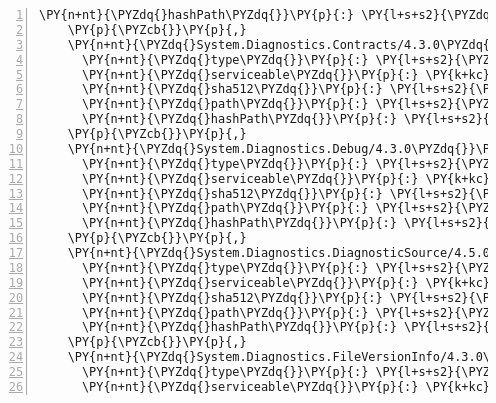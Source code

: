 \begin{Verbatim}[commandchars=\\\{\},numbers=left,firstnumber=1,stepnumber=1,numberblanklines=0]
      \PY{n+nt}{\PYZdq{}hashPath\PYZdq{}}\PY{p}{:} \PY{l+s+s2}{\PYZdq{}system.data.sqlclient.4.5.0\PYZhy{}rc1.nupkg.sha512\PYZdq{}}
    \PY{p}{\PYZcb{}}\PY{p}{,}
    \PY{n+nt}{\PYZdq{}System.Diagnostics.Contracts/4.3.0\PYZdq{}}\PY{p}{:} \PY{p}{\PYZob{}}
      \PY{n+nt}{\PYZdq{}type\PYZdq{}}\PY{p}{:} \PY{l+s+s2}{\PYZdq{}package\PYZdq{}}\PY{p}{,}
      \PY{n+nt}{\PYZdq{}serviceable\PYZdq{}}\PY{p}{:} \PY{k+kc}{true}\PY{p}{,}
      \PY{n+nt}{\PYZdq{}sha512\PYZdq{}}\PY{p}{:} \PY{l+s+s2}{\PYZdq{}sha512\PYZhy{}eelRRbnm+OloiQvp9CXS0ixjNQldjjkHO4iIkR5XH2VIP8sUB/SIpa1TdUW6/+HDcQ+MlhP3pNa1u5SbzYuWGA==\PYZdq{}}\PY{p}{,}
      \PY{n+nt}{\PYZdq{}path\PYZdq{}}\PY{p}{:} \PY{l+s+s2}{\PYZdq{}system.diagnostics.contracts/4.3.0\PYZdq{}}\PY{p}{,}
      \PY{n+nt}{\PYZdq{}hashPath\PYZdq{}}\PY{p}{:} \PY{l+s+s2}{\PYZdq{}system.diagnostics.contracts.4.3.0.nupkg.sha512\PYZdq{}}
    \PY{p}{\PYZcb{}}\PY{p}{,}
    \PY{n+nt}{\PYZdq{}System.Diagnostics.Debug/4.3.0\PYZdq{}}\PY{p}{:} \PY{p}{\PYZob{}}
      \PY{n+nt}{\PYZdq{}type\PYZdq{}}\PY{p}{:} \PY{l+s+s2}{\PYZdq{}package\PYZdq{}}\PY{p}{,}
      \PY{n+nt}{\PYZdq{}serviceable\PYZdq{}}\PY{p}{:} \PY{k+kc}{true}\PY{p}{,}
      \PY{n+nt}{\PYZdq{}sha512\PYZdq{}}\PY{p}{:} \PY{l+s+s2}{\PYZdq{}sha512\PYZhy{}ZUhUOdqmaG5Jk3Xdb8xi5kIyQYAA4PnTNlHx1mu9ZY3qv4ELIdKbnL/akbGaKi2RnNUWaZsAs31rvzFdewTj2g==\PYZdq{}}\PY{p}{,}
      \PY{n+nt}{\PYZdq{}path\PYZdq{}}\PY{p}{:} \PY{l+s+s2}{\PYZdq{}system.diagnostics.debug/4.3.0\PYZdq{}}\PY{p}{,}
      \PY{n+nt}{\PYZdq{}hashPath\PYZdq{}}\PY{p}{:} \PY{l+s+s2}{\PYZdq{}system.diagnostics.debug.4.3.0.nupkg.sha512\PYZdq{}}
    \PY{p}{\PYZcb{}}\PY{p}{,}
    \PY{n+nt}{\PYZdq{}System.Diagnostics.DiagnosticSource/4.5.0\PYZhy{}rc1\PYZdq{}}\PY{p}{:} \PY{p}{\PYZob{}}
      \PY{n+nt}{\PYZdq{}type\PYZdq{}}\PY{p}{:} \PY{l+s+s2}{\PYZdq{}package\PYZdq{}}\PY{p}{,}
      \PY{n+nt}{\PYZdq{}serviceable\PYZdq{}}\PY{p}{:} \PY{k+kc}{true}\PY{p}{,}
      \PY{n+nt}{\PYZdq{}sha512\PYZdq{}}\PY{p}{:} \PY{l+s+s2}{\PYZdq{}sha512\PYZhy{}/lWxkYHpLF4ols3Iip9dFQoxGXV2ZY4nCD07nV2PNROeCkvAtpdjX2HPYAd+KVRaK1f5te7MVofV8UAJlaVsww==\PYZdq{}}\PY{p}{,}
      \PY{n+nt}{\PYZdq{}path\PYZdq{}}\PY{p}{:} \PY{l+s+s2}{\PYZdq{}system.diagnostics.diagnosticsource/4.5.0\PYZhy{}rc1\PYZdq{}}\PY{p}{,}
      \PY{n+nt}{\PYZdq{}hashPath\PYZdq{}}\PY{p}{:} \PY{l+s+s2}{\PYZdq{}system.diagnostics.diagnosticsource.4.5.0\PYZhy{}rc1.nupkg.sha512\PYZdq{}}
    \PY{p}{\PYZcb{}}\PY{p}{,}
    \PY{n+nt}{\PYZdq{}System.Diagnostics.FileVersionInfo/4.3.0\PYZdq{}}\PY{p}{:} \PY{p}{\PYZob{}}
      \PY{n+nt}{\PYZdq{}type\PYZdq{}}\PY{p}{:} \PY{l+s+s2}{\PYZdq{}package\PYZdq{}}\PY{p}{,}
      \PY{n+nt}{\PYZdq{}serviceable\PYZdq{}}\PY{p}{:} \PY{k+kc}{true}\PY{p}{,}

\end{Verbatim}
